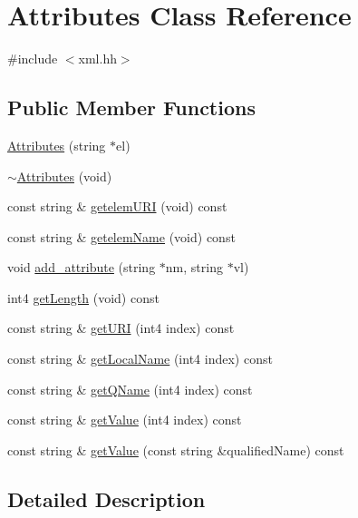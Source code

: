 \hypertarget{class_attributes}{}\section{Attributes Class Reference}
\label{class_attributes}


{\ttfamily \#include $<$xml.\+hh$>$}

\subsection*{Public Member Functions}
\begin{DoxyCompactItemize}
\item 
\mbox{\hyperlink{class_attributes_abdd2066e49bfdf6f9c6c6ce8cb9d248a}{Attributes}} (string $\ast$el)
\item 
\mbox{\hyperlink{class_attributes_ad397fc8278fd4d11ff52d02a4d482a68}{$\sim$\+Attributes}} (void)
\item 
const string \& \mbox{\hyperlink{class_attributes_aeffc6eecf52d20af15ea95a6b2f66419}{getelem\+U\+RI}} (void) const
\item 
const string \& \mbox{\hyperlink{class_attributes_a0099cc604008a7ae3ee8f85f4e241848}{getelem\+Name}} (void) const
\item 
void \mbox{\hyperlink{class_attributes_afb97d6c90709f45f2eba30df107a1a86}{add\+\_\+attribute}} (string $\ast$nm, string $\ast$vl)
\item 
int4 \mbox{\hyperlink{class_attributes_a336a1c1696086546233624fb0c2e693c}{get\+Length}} (void) const
\item 
const string \& \mbox{\hyperlink{class_attributes_ae14e94adde0a7916fff11e6aa689a556}{get\+U\+RI}} (int4 index) const
\item 
const string \& \mbox{\hyperlink{class_attributes_a4f09b15c3cb6b028b286da593ca7a7d5}{get\+Local\+Name}} (int4 index) const
\item 
const string \& \mbox{\hyperlink{class_attributes_afdf2edc0fc509c437fc732db7979fdae}{get\+Q\+Name}} (int4 index) const
\item 
const string \& \mbox{\hyperlink{class_attributes_a524876a223428293240fb40a3e480d70}{get\+Value}} (int4 index) const
\item 
const string \& \mbox{\hyperlink{class_attributes_a0f76e455894d4f5ac542389c640bc510}{get\+Value}} (const string \&qualified\+Name) const
\end{DoxyCompactItemize}


\subsection{Detailed Description}


